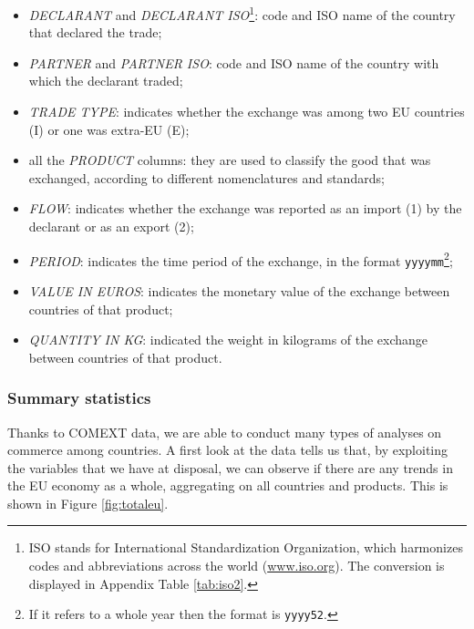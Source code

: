 \begin{itemize}
    \item \textit{DECLARANT} and \textit{DECLARANT ISO}\footnote{ISO stands for International Standardization Organization, which harmonizes codes and abbreviations across the world (\url{www.iso.org}). The conversion is displayed in Appendix Table \ref{tab:iso2}.}: code and ISO name of the country that declared the trade;
    \item \textit{PARTNER} and \textit{PARTNER ISO}: code and ISO name of the country with which the declarant traded;
    \item \textit{TRADE TYPE}: indicates whether the exchange was among two EU countries (I) or one was extra-EU (E);
    \item all the \textit{PRODUCT} columns: they are used to classify the good that was exchanged, according to different nomenclatures and standards;
    \item \textit{FLOW}: indicates whether the exchange was reported as an import (1) by the declarant or as an export (2);
    \item \textit{PERIOD}: indicates the time period of the exchange, in the format \texttt{yyyymm}\footnote{If it refers to a whole year then the format is \texttt{yyyy52}.};
    \item \textit{VALUE IN EUROS}: indicates the monetary value of the exchange between countries of that product;
    \item \textit{QUANTITY IN KG}: indicated the weight in kilograms of the exchange between countries of that product.
\end{itemize}



\subsubsection{Summary statistics}
Thanks to COMEXT data, we are able to conduct many types of analyses on commerce among countries. A first look at the data tells us that, by exploiting the variables that we have at disposal, we can observe if there are any trends in the EU economy as a whole, aggregating on all countries and products. This is shown in Figure \ref{fig:totaleu}. 

